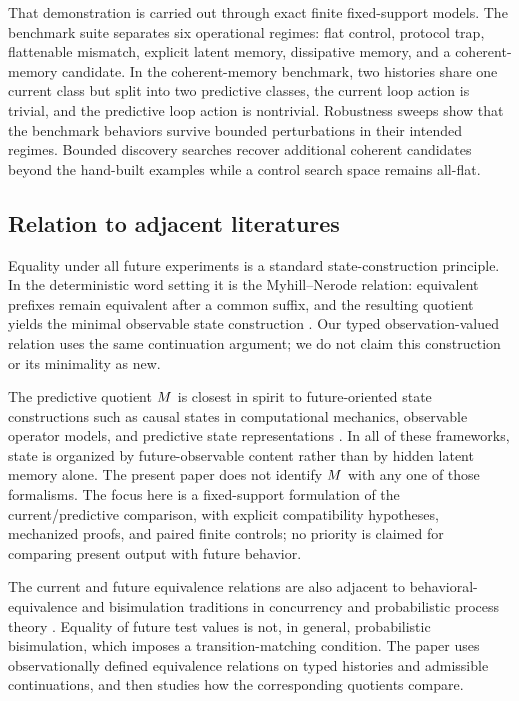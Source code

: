 \documentclass[11pt]{article}
\theoremstyle{definition}
\begin{document}
That demonstration is carried out through exact finite fixed-support models. The benchmark suite separates six operational regimes: flat control, protocol trap, flattenable mismatch, explicit latent memory, dissipative memory, and a coherent-memory candidate. In the coherent-memory benchmark, two histories share one current class but split into two predictive classes, the current loop action is trivial, and the predictive loop action is nontrivial. Robustness sweeps show that the benchmark behaviors survive bounded perturbations in their intended regimes. Bounded discovery searches recover additional coherent candidates beyond the hand-built examples while a control search space remains all-flat.

\subsection{Relation to adjacent literatures}\label{subsec:intro-related}
Equality under all future experiments is a standard state-construction principle. In the deterministic word setting it is the Myhill--Nerode relation: equivalent prefixes remain equivalent after a common suffix, and the resulting quotient yields the minimal observable state construction \citep{Nerode1958LinearAutomatonTransformations}. Our typed observation-valued relation uses the same continuation argument; we do not claim this construction or its minimality as new.

The predictive quotient $M$ is closest in spirit to future-oriented state constructions such as causal states in computational mechanics, observable operator models, and predictive state representations \citep{ShaliziCrutchfield2001ComputationalMechanics,Jaeger2000ObservableOperatorModels,LittmanSuttonSingh2002PredictiveRepresentationsState}. In all of these frameworks, state is organized by future-observable content rather than by hidden latent memory alone. The present paper does not identify $M$ with any one of those formalisms. The focus here is a fixed-support formulation of the current/predictive comparison, with explicit compatibility hypotheses, mechanized proofs, and paired finite controls; no priority is claimed for comparing present output with future behavior.

The current and future equivalence relations are also adjacent to behavioral-equivalence and bisimulation traditions in concurrency and probabilistic process theory \citep{Park1981ConcurrencyAutomata,Milner1989CommunicationConcurrency,LarsenSkou1991BisimulationThroughProbabilisticTesting}. Equality of future test values is not, in general, probabilistic bisimulation, which imposes a transition-matching condition. The paper uses observationally defined equivalence relations on typed histories and admissible continuations, and then studies how the corresponding quotients compare.
\end{document}
